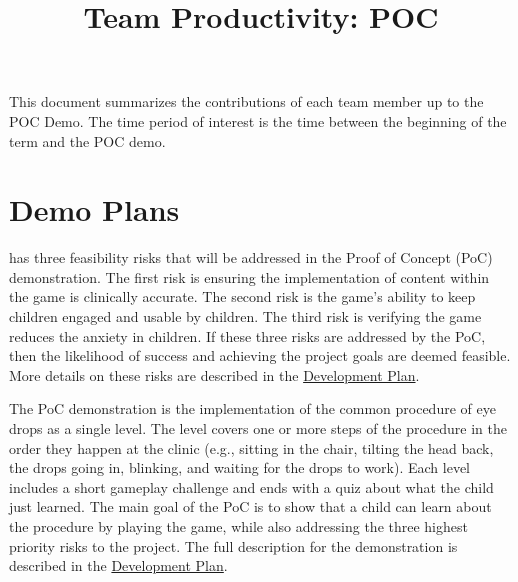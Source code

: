 \documentclass[10pt, titlepage]{article}
\title{Team Productivity: POC\\\progname}
\author{\authname}
\date{}
\begin{document}
\maketitle

This document summarizes the contributions of each team member up to the POC
Demo. The time period of interest is the time between the beginning of the term
and the POC demo.




\section{Demo Plans}

\progname{} has three feasibility risks that will be addressed in the Proof of Concept (PoC) 
demonstration. The first risk is ensuring the implementation of content within the game is 
clinically accurate. The second risk is the game's ability to keep children engaged and usable 
by children. The third risk is verifying the game reduces the anxiety in children. If these three 
risks are addressed by the PoC, then the likelihood of success and achieving the project goals are 
deemed feasible. More details on these risks are described in the 
\href{https://team-hindsight.github.io/ophthamology-game/DevelopmentPlan/DevelopmentPlan.pdf}{Development Plan}.

The PoC demonstration is the implementation of the common procedure of eye drops as a single level. The level 
covers one or more steps of the procedure in the order they happen at the clinic (e.g., sitting in the chair, 
tilting the head back, the drops going in, blinking, and waiting for the drops to work). Each level includes a 
short gameplay challenge and ends with a quiz about what the child just learned. The main goal of the PoC is to 
show that a child can learn about the procedure by playing the game, while also addressing the three highest 
priority risks to the project. The full description for the demonstration is described in the
\href{https://team-hindsight.github.io/ophthamology-game/DevelopmentPlan/DevelopmentPlan.pdf}{Development Plan}.
\end{document}
